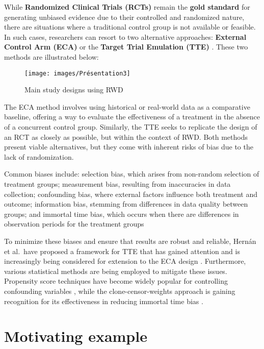 \documentclass[
]{book}
\begin{document}
While \textbf{Randomized Clinical Trials (RCTs)} remain the \textbf{gold standard} for generating unbiased evidence due to their controlled and randomized nature, there are situations where a traditional control group is not available or feasible. In such cases, researchers can resort to two alternative approaches: \textbf{External Control Arm (ECA)} or the \textbf{Target Trial Emulation (TTE)} \citep{baumfeld_andre_trial_2020, hernan_using_2016}. These two methods are illustrated below:

\begin{figure}

{\centering \texttt{[image: images/Présentation3]} 

}

\caption{Main study designs using RWD}\label{fig:unnamed-chunk-1}
\end{figure}

The ECA method involves using historical or real-world data as a comparative baseline, offering a way to evaluate the effectiveness of a treatment in the absence of a concurrent control group. Similarly, the TTE seeks to replicate the design of an RCT as closely as possible, but within the context of RWD. Both methods present viable alternatives, but they come with inherent risks of bias due to the lack of randomization.

Common biases include: selection bias, which arises from non-random selection of treatment groups; measurement bias, resulting from inaccuracies in data collection; confounding bias, where external factors influence both treatment and outcome; information bias, stemming from differences in data quality between groups; and immortal time bias, which occurs when there are differences in observation periods for the treatment groups

To minimize these biases and ensure that results are robust and reliable, Hernán et al.~have proposed a framework for TTE that has gained attention and is increasingly being considered for extension to the ECA design \citep{hernan_using_2016, polito_applying_2024}. Furthermore, various statistical methods are being employed to mitigate these issues. Propensity score techniques have become widely popular for controlling confounding variables \citep{austin_introduction_2011}, while the clone-censor-weights approach is gaining recognition for its effectiveness in reducing immortal time bias \citep{maringe_reflection_2020}.

\chapter{Motivating example}\label{motivating-example}
\end{document}
